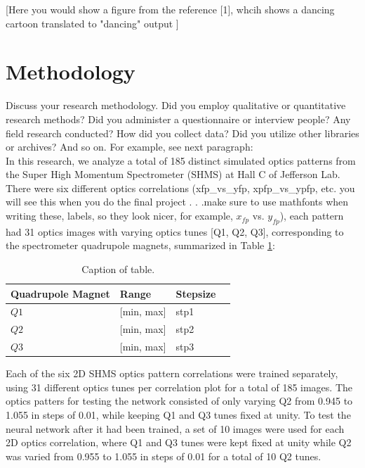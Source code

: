 \documentclass[conference]{IEEEtran}
\begin{document}
[Here you would show a figure from the reference [1], whcih shows a dancing cartoon translated to "dancing" output ]

\section{Methodology}
Discuss your research methodology. Did you employ qualitative or quantitative research methods?
Did you administer a questionnaire or interview people? Any field research conducted? How did you collect data?
Did you utilize other libraries or archives? And so on. For example, see next paragraph:\\
\indent In this research, we analyze a total of 185 distinct simulated optics patterns from the Super High Momentum Spectrometer (SHMS) at Hall C of Jefferson Lab.
There were six different optics correlations (xfp\_vs\_yfp, xpfp\_vs\_ypfp, etc. you will see this when you do the final project . . .make sure to use mathfonts when writing these,
labels, so they look nicer, for example, $x_{fp}$ vs. $y_{fp}$), each pattern had 31 optics images with varying optics tunes [Q1, Q2, Q3], corresponding to the spectrometer quadrupole magnets, summarized in Table \ref{tab:tune_stpSize}:

\begin{table}[h]
	\begin{center}
		\begin{tabular}{llll} %
                  \hline
                  Quadrupole Magnet & Range & Stepsize \\
                  \hline\hline
	          $Q1$ & [min, max] & stp1  \\
                  $Q2$ & [min, max] & stp2  \\
                  $Q3$ & [min, max] & stp3  \\                       
                  \hline 
		\end{tabular}
	\end{center}
	\caption{Caption of table.}
	\label{tab:tune_stpSize}
\end{table}

Each of the six 2D SHMS optics pattern correlations were trained separately, using 31 different optics tunes
per correlation plot for a total of 185 images. The optics patters for testing the network consisted of only
varying Q2 from 0.945 to 1.055 in steps of 0.01, while keeping Q1 and Q3 tunes fixed at unity.
To test the neural network after it had been trained, a set of 10 images were used for each 2D optics correlation, where Q1 and Q3
tunes were kept fixed at unity while Q2 was varied from 0.955 to 1.055 in steps of 0.01 for a total of 10 Q2 tunes.\\
\end{document}
